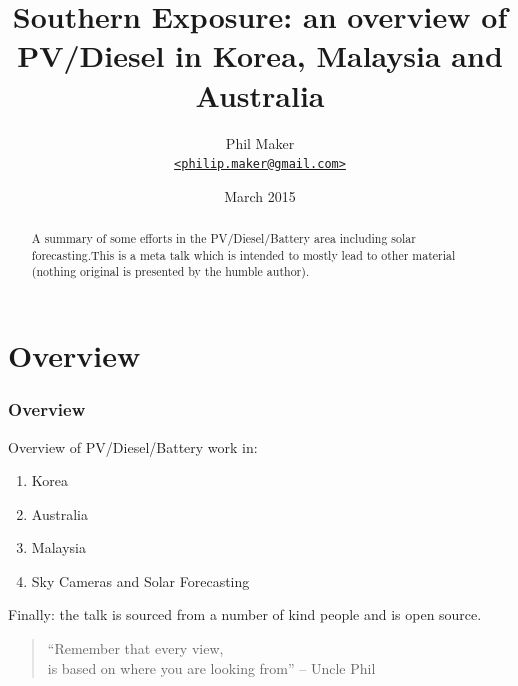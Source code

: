 \documentclass{beamer}
\title{Southern Exposure: an overview of PV/Diesel in Korea, Malaysia and
  Australia}
\author{Phil Maker\\
  \href{mailto:philip.maker@gmail.com}{\texttt{<philip.maker@gmail.com>}}
}
\institute{Alaskan Center for Energy and Power}
\date{March 2015}
\begin{document}
\begin{frame}
  \maketitle
  \vspace{-0.6cm}
  \begin{abstract}
    \small A summary of some efforts in the PV/Diesel/Battery
    area including solar forecasting.This is a meta talk which is
    intended to mostly lead to other material (nothing original is
    presented by the humble author).
  \end{abstract}
\end{frame}

\section{Overview}
\begin{frame}\frametitle{Overview}
Overview of PV/Diesel/Battery work in:
 
  \begin{enumerate}
  \item Korea
  \item Australia
  \item Malaysia 
  \item Sky Cameras and Solar Forecasting
  \end{enumerate}
\pause
Finally: the talk is sourced from a number 
of kind people and is open source.
\pause
\vfill
\begin{quote}
``Remember that every view,
\pause\\
is based on where you are looking from'' -- Uncle Phil
\end{quote}
\end{frame}
\end{document}
